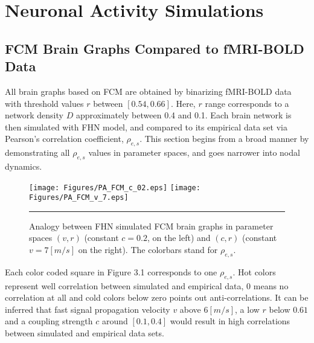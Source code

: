 \label{Chapter3} %



\section{Neuronal Activity Simulations}

\subsection{FCM Brain Graphs Compared to fMRI-BOLD Data}

All brain graphs based on FCM are obtained by binarizing fMRI-BOLD data with threshold values $r$ between $[0.54, 0.66]$. Here, $r$ range corresponds to a network density $D$ approximately between 0.4 and 0.1. Each brain network is then simulated with FHN model, and compared to its empirical data set via Pearson's correlation coefficient, $\rho_{e,s}$. This section begins from a broad manner by demonstrating all $\rho_{e,s}$ values in parameter spaces, and goes narrower into nodal dynamics. 

\begin{figure}[htbp]
 
  \centering
    \texttt{[image: Figures/PA\_FCM\_c\_02.eps]} 
	\texttt{[image: Figures/PA\_FCM\_v\_7.eps]} 

	
    \rule{35em}{0.5pt}
  \caption[Parameter Analysis, FCM]{Analogy between FHN simulated FCM brain graphs in parameter spaces $(v,r)$ (constant $c=0.2$, on the left) and $(c,r)$ (constant $v=7[m/s]$ on the right). The colorbars stand for $\rho_{e,s}$.   }
  \label{fig:Parameter Analysis, FCM}
 	
\end{figure}  

Each color coded square in Figure 3.1 corresponds to one $\rho_{e,s}$. Hot colors represent well correlation between simulated and empirical data, 0 means no correlation at all and cold colors below zero points out anti-correlations. It can be inferred that fast signal propagation velocity $v$ above $6 [m/s]$, a low $r$ below $0.61$ and a coupling strength $c$ around $[0.1, 0.4]$ would result in high correlations between simulated and empirical data sets.    

